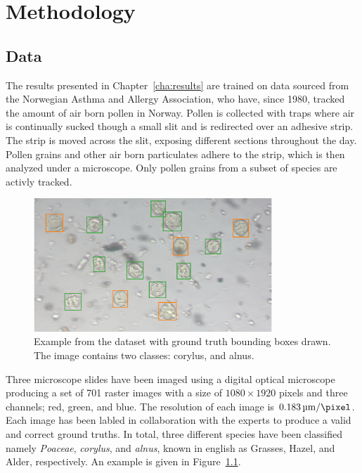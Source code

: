 \chapter{Methodology}\label{cha:method}

\section{Data}\label{sec:dataset}
The results presented in Chapter~\ref{cha:results} are trained on data sourced from the Norwegian Asthma and Allergy Association, who have, since 1980, tracked the amount of air born pollen in Norway.
Pollen is collected with traps where air is continually sucked though a small slit and is redirected over an adhesive strip.
The strip is moved across the slit, exposing different sections throughout the day.
Pollen grains and other air born particulates adhere to the strip, which is then analyzed under a microscope.
Only pollen grains from a subset of species are activly tracked.

\begin{figure}[htbp]
  \centering
  \includegraphics[width=0.8\textwidth]{figs/Snap-057.png}
  \caption[Dataset example]{Example from the dataset with ground truth bounding boxes drawn. The image contains two classes: \textcolor{corylus}{corylus}, and \textcolor{alnus}{alnus}.}\label{fig:dataset-sample}
\end{figure}

Three microscope slides have been imaged using a digital optical microscope producing a set of 701 raster images with a size of \(1080\times 1920\) pixels and three channels; red, green, and blue.
The resolution of each image is \(\SI{0.183}{\micro\metre\per\pixel}\).
Each image has been labled in collaboration with the experts to produce a valid and correct ground truths.
In total, three different species have been classified namely \textit{Poaceae}, \textit{corylus}, and \textit{alnus}, known in english as Grasses, Hazel, and Alder, respectively. An example is given in Figure~\ref{fig:dataset-sample}.

